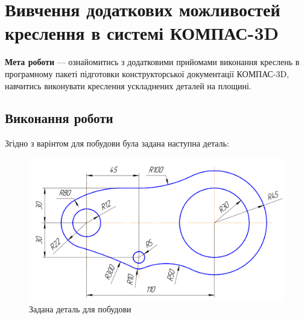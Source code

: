 \chapter[~]{Вивчення додаткових можливостей креслення в системі КОМПАС-3D}

\textbf{Мета роботи} --- ознайомитись з додатковими прийомами виконання креслень в програмному
пакеті підготовки конструкторської документації КОМПАС-3D, навчитись виконувати креслення
ускладнених деталей на площині.

\section{Виконання роботи}

Згідно з варінтом для побудови була задана наступна деталь:

\begin{figure}[!ht]
  \centering \includegraphics[width=0.9\linewidth]{./images/lab4/target_drawing.png}
  \caption{Задана деталь для побудови}
  \label{fig:lab3:target_part} 
\end{figure}
\FloatBarrier

